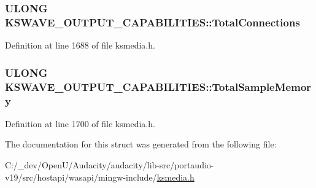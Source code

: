 \subsubsection[{\texorpdfstring{Total\+Connections}{TotalConnections}}]{\setlength{\rightskip}{0pt plus 5cm}U\+L\+O\+NG K\+S\+W\+A\+V\+E\+\_\+\+O\+U\+T\+P\+U\+T\+\_\+\+C\+A\+P\+A\+B\+I\+L\+I\+T\+I\+E\+S\+::\+Total\+Connections}\hypertarget{struct_k_s_w_a_v_e___o_u_t_p_u_t___c_a_p_a_b_i_l_i_t_i_e_s_a3c99e536331f4dd220875d846621069d}{}\label{struct_k_s_w_a_v_e___o_u_t_p_u_t___c_a_p_a_b_i_l_i_t_i_e_s_a3c99e536331f4dd220875d846621069d}


Definition at line 1688 of file ksmedia.\+h.

\subsubsection[{\texorpdfstring{Total\+Sample\+Memory}{TotalSampleMemory}}]{\setlength{\rightskip}{0pt plus 5cm}U\+L\+O\+NG K\+S\+W\+A\+V\+E\+\_\+\+O\+U\+T\+P\+U\+T\+\_\+\+C\+A\+P\+A\+B\+I\+L\+I\+T\+I\+E\+S\+::\+Total\+Sample\+Memory}\hypertarget{struct_k_s_w_a_v_e___o_u_t_p_u_t___c_a_p_a_b_i_l_i_t_i_e_s_a415cf8a2c6f8c7f319cec8749a3bb27a}{}\label{struct_k_s_w_a_v_e___o_u_t_p_u_t___c_a_p_a_b_i_l_i_t_i_e_s_a415cf8a2c6f8c7f319cec8749a3bb27a}


Definition at line 1700 of file ksmedia.\+h.



The documentation for this struct was generated from the following file\+:\begin{DoxyCompactItemize}
\item 
C\+:/\+\_\+dev/\+Open\+U/\+Audacity/audacity/lib-\/src/portaudio-\/v19/src/hostapi/wasapi/mingw-\/include/\hyperlink{ksmedia_8h}{ksmedia.\+h}\end{DoxyCompactItemize}
